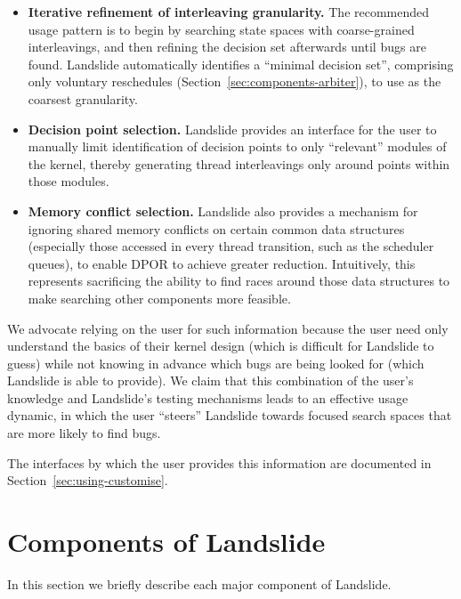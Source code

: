 {\begin{itemize}
	\item {\bf Iterative refinement of interleaving granularity.} The recommended usage pattern is to begin by searching state spaces with coarse-grained interleavings, and then refining the decision set afterwards until bugs are found. Landslide automatically identifies a ``minimal decision set'', comprising only voluntary reschedules (Section~\ref{sec:components-arbiter}), to use as the coarsest granularity.
	\item {\bf Decision point selection.} Landslide provides an interface for the user to manually limit identification of decision points to only ``relevant'' modules of the kernel, thereby generating thread interleavings only around points within those modules.
	\item {\bf Memory conflict selection.} Landslide also provides a mechanism for ignoring shared memory conflicts on certain common data structures (especially those accessed in every thread transition, such as the scheduler queues), to enable DPOR to achieve greater reduction. Intuitively, this represents sacrificing the ability to find races around those data structures to make searching other components more feasible.
\end{itemize}

We advocate relying on the user for such information because the user need only understand the basics of their kernel design (which is difficult for Landslide to guess) while not knowing in advance which bugs are being looked for (which Landslide is able to provide). We claim that this combination of the user's knowledge and Landslide's testing mechanisms leads to an effective usage dynamic, in which the user ``steers'' Landslide towards focused search spaces that are more likely to find bugs.

The interfaces by which the user provides this information are documented in Section~\ref{sec:using-customise}.
}

\section{Components of Landslide}
\label{sec:components}

In this section we briefly describe each major component of Landslide.

